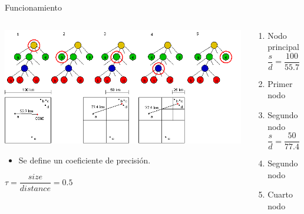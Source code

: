 \documentclass{beamer}
\begin{document}
\begin{frame}{Funcionamiento}
	\begin{columns}
		\begin{column}{0.6\textwidth}
			\centering
			\includegraphics[width=\linewidth]{sources/images/force.png}\\
			\begin{itemize}
				\item Se define un coeficiente de precisi\'on.
			\end{itemize}
			$\tau = \dfrac{size}{distance} = 0.5$
			\pause
		\vspace{1cm}
		
		\end{column}
		\begin{column}{0.4\textwidth}
			\begin{enumerate}
				\footnotesize
				\item {\color{orange} Nodo principal} \pause
				\begin{equation*}
					\dfrac{s}{d} = \dfrac{100}{55.7} \approx 1.8 > \tau 
				\end{equation*}
				\pause
				\item {\color{green} Primer nodo} \pause
				\item {\color{green} Segundo nodo} \pause
				\begin{equation*}
					\dfrac{s}{d} = \dfrac{50}{77.4} \approx 0.6 > \tau
				\end{equation*}
				\pause
				\item {\color{blue} Segundo nodo} \pause
				\pause
				\item {\color{green} Cuarto nodo} \pause
			\end{enumerate}
		\end{column}
	\end{columns}
\end{frame}
\end{document}
